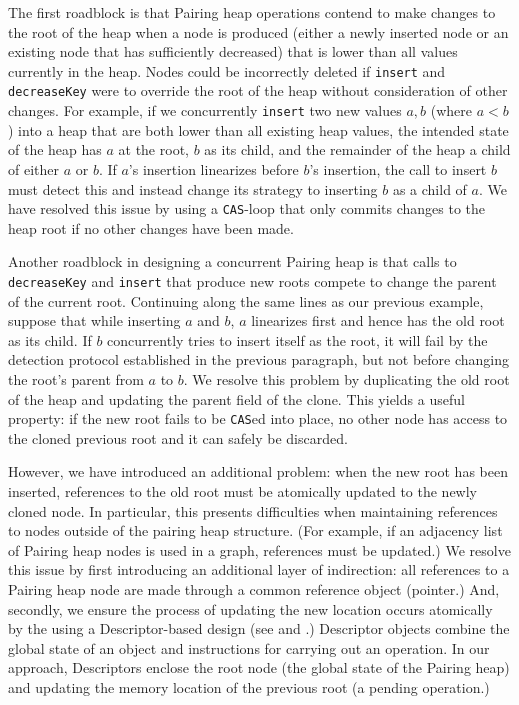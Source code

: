 \documentclass{acm_proc_article-sp}
\begin{document}
The first roadblock is that Pairing heap operations contend to
make changes to the root of the heap when a node is produced (either a newly inserted
node or an existing node that has sufficiently decreased)
that is lower than all values currently in the heap.
Nodes could be incorrectly deleted if \texttt{insert} and \texttt{decreaseKey}
were to override the root of the heap without consideration of other changes.
For example, if we concurrently \texttt{insert} two new values $a,b$ (where $a < b$) into a
heap that are both lower than all existing heap values, the intended state of the heap
has $a$ at the root, $b$ as its child, and the remainder of the heap a child of either $a$
or $b$. If
$a$'s insertion linearizes before $b$'s insertion, the call to insert $b$ must detect this
and instead change its strategy to inserting $b$ as a child of $a$. We have resolved
this issue by using a \texttt{CAS}-loop that only commits changes to the heap root
if no other changes have been made.

Another roadblock in designing a concurrent Pairing heap is that calls to
\texttt{decreaseKey} and \texttt{insert} that produce new roots
compete to change the parent of the current root. Continuing along the same
lines as our previous example, suppose that while inserting $a$ and $b$,
$a$ linearizes first and hence has the old root as its child. If $b$ concurrently
tries to insert itself as the root, it will fail by the detection protocol established
in the previous paragraph, but not before changing the root's parent from $a$ to $b$.
We resolve this problem by duplicating the old root of the heap and updating
the parent field of the clone. This yields a useful property:
if the new root fails to be \texttt{CAS}ed into place, no other node has
access to the cloned previous root and it can safely be discarded.

However, we have
introduced an additional problem: when the new root has been inserted, references
to the old root must be atomically updated to the newly cloned node. In particular, this
presents difficulties when maintaining references
to nodes outside of the pairing heap structure. (For example, if an adjacency list
of Pairing heap nodes is used in a graph, references must be updated.)
We resolve this issue by first introducing an additional layer of indirection: all references
to a Pairing heap node are made through a common reference object (pointer.) And, secondly,
we ensure the process of updating the new location occurs atomically by the using
a Descriptor-based design (see \cite{fraser07} and \cite{dechev10}.) Descriptor objects
combine the global state of an object and instructions for carrying out an operation.
In our approach, Descriptors enclose the root node (the global state of the Pairing heap)
and updating the memory location of the previous root (a pending operation.)
\end{document}
